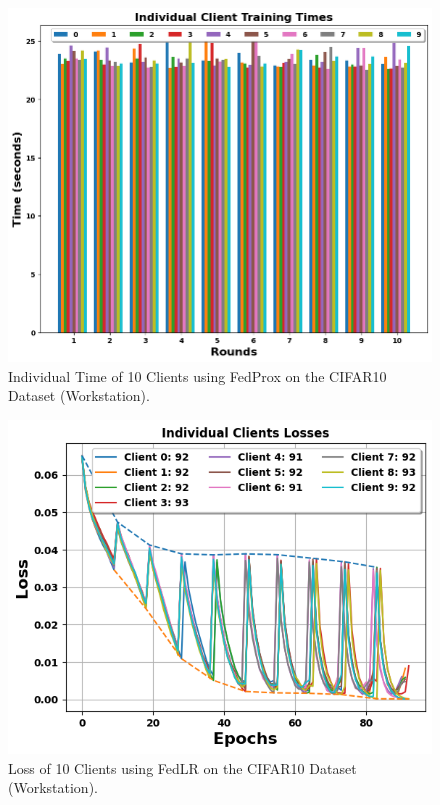 \documentclass[conference]{IEEEtran}
\begin{document}
\begin{figure}[htp!]
	\centering
	\includegraphics[scale=.4]{Images/NEWGRAPHS/time_fedprox_653o8.png }
	\caption{Individual Time of 10 Clients using FedProx on the CIFAR10 Dataset (Workstation).}
	\label{FedProxTimeC10}
\end{figure}


%

\begin{figure}[htp!]
	\centering
	\includegraphics[scale=.51]{Images/NEWGRAPHS/loss_fedlr.png}
	\caption{Loss of 10 Clients using FedLR on the CIFAR10 Dataset (Workstation).}
	\label{lossFedLRC10}
\end{figure}
\end{document}
